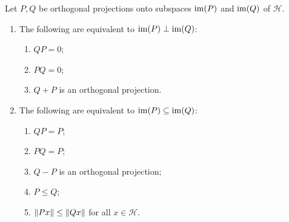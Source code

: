 \begin{proposition} \label{prop:perpendicularProjections} \label{prop:subspaceProjections}
Let $P,Q$ be orthogonal projections onto subspaces $\operatorname{im}(P)$ and $\operatorname{im}(Q)$ of $\mathcal{H}$.
\begin{enumerate}
\item The following are equivalent to $\operatorname{im}(P) \perp \operatorname{im}(Q)$:
\begin{enumerate}
\item $QP = 0$;
\item $PQ = 0$;
\item $Q+P$ is an orthogonal projection.
\end{enumerate}
\item The following are equivalent to $\operatorname{im}(P) \subseteq \operatorname{im}(Q)$:
\begin{enumerate}
\item $QP = P$;
\item $PQ = P$;
\item $Q-P$ is an orthogonal projection;
\item $P\leq Q$;
\item $\lVert Px\rVert \leq \lVert Qx\rVert$ for all $x \in \mathcal{H}$.
\end{enumerate}
\end{enumerate}
\end{proposition}
